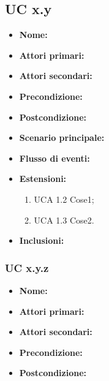 \documentclass[a4paper, oneside, dvipsnames, table]{article} %
\begin{document}
\subsection{UC x.y}%
\begin{itemize}
\item \textbf{Nome:}
\item \textbf{Attori primari:}
\item \textbf{Attori secondari:}%
\item \textbf{Precondizione:}
\item \textbf{Postcondizione:}
\item \textbf{Scenario principale:} %
\item \textbf{Flusso di eventi:} %
\item \textbf{Estensioni:}
	\begin{enumerate}
		\item UCA 1.2 Cose1;
		\item UCA 1.3 Cose2.
	\end{enumerate}
\item \textbf{Inclusioni:}
\end{itemize}

\subsubsection{UC x.y.z}%
\begin{itemize}
\item \textbf{Nome:}
\item \textbf{Attori primari:}
\item \textbf{Attori secondari:}%
\item \textbf{Precondizione:}
\item \textbf{Postcondizione:}
\end{itemize}
\end{document}
